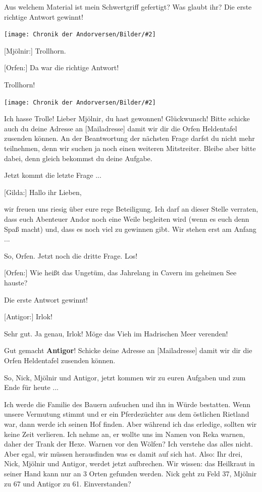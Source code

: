 \documentclass[10pt, a4paper, oneside]{book}
\newcommand{\bildmitts}[2][height=0.32\textwidth,width=0.48\textwidth,keepaspectratio]{%
    \begin{center}
        \texttt{[image: Chronik der Andorversen/Bilder/\#2]}
    \end{center}
}
\begin{document}
\begin{multicols}{2}
Aus welchem Material ist mein Schwertgriff gefertigt? Was glaubt ihr? Die erste richtige Antwort gewinnt!

\bildmitts{AA2015 Der Auftrag 5.jpeg}

[Mjölnir:] Trollhorn. 

[Orfen:] Da war die richtige Antwort!

Trollhorn!

\bildmitts{AA2015 Der Auftrag 6.jpeg}


Ich hasse Trolle! Lieber Mjölnir, du hast gewonnen! Glückwunsch! Bitte schicke auch du deine Adresse an [Mailadresse] damit wir dir die Orfen Heldentafel zusenden können. An der Beantwortung der nächsten Frage darfst du nicht mehr teilnehmen, denn wir suchen ja noch einen weiteren Mitstreiter. Bleibe aber bitte dabei, denn gleich bekommst du deine Aufgabe.

Jetzt kommt die letzte Frage ...

[Gilda:] Hallo ihr Lieben,

wir freuen uns riesig über eure rege Beteiligung. Ich darf an dieser Stelle verraten, dass euch Abenteuer Andor noch eine Weile begleiten wird (wenn es euch denn Spaß macht) und, dass es noch viel zu gewinnen gibt. Wir stehen erst am Anfang ...

So, Orfen. Jetzt noch die dritte Frage. Los!

[Orfen:] Wie heißt das Ungetüm, das Jahrelang in Cavern im geheimen See hauste?

Die erste Antwort gewinnt!

[Antigor:] Irlok!

Sehr gut. Ja genau, Irlok! Möge das Vieh im Hadrischen Meer verenden!

Gut gemacht \textbf{Antigor}! Schicke deine Adresse an [Mailadresse] damit wir dir die Orfen Heldentafel zusenden können.

So, Nick, Mjölnir und Antigor, jetzt kommen wir zu euren Aufgaben und zum Ende für heute ...

Ich werde die Familie des Bauern aufsuchen und ihn in Würde bestatten. Wenn unsere Vermutung stimmt und er ein Pferdezüchter aus dem östlichen Rietland war, dann werde ich seinen Hof finden. Aber während ich das erledige, sollten wir keine Zeit verlieren. Ich nehme an, er wollte uns im Namen von Reka warnen, daher der Trank der Hexe. Warnen vor den Wölfen? Ich verstehe das alles nicht. Aber egal, wir müssen herausfinden was es damit auf sich hat. Also: Ihr drei, Nick, Mjölnir und Antigor, werdet jetzt aufbrechen. Wir wissen: das Heilkraut in seiner Hand kann nur an 3 Orten gefunden werden. Nick geht zu Feld 37, Mjölnir zu 67 und Antigor zu 61. Einverstanden?


\end{multicols}
\end{document}
